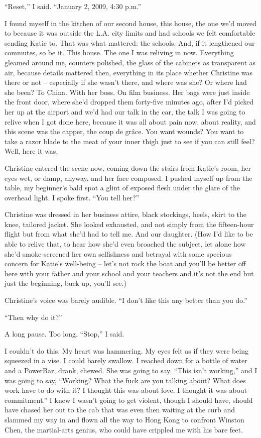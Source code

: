 \documentclass[11pt,a4paper]{article}
\newcommand{\qm}[1]{“#1”}
\begin{document}
\qm{Reset,} I said. \qm{January 2, 2009, 4:30 p.m.}

I found myself in the kitchen of our second house, this house, the one we'd moved to because it was outside the L.A. city limits and had schools we felt comfortable sending Katie to. That was what mattered: the schools. And, if it lengthened our commutes, so be it. This house. The one I was reliving in now. Everything gleamed around me, counters polished, the glass of the cabinets as transparent as air, because details mattered then, everything in its place whether Christine was there or not – especially if she wasn't there, and where was she? Or where had she been? To China. With her boss. On film business. Her bags were just inside the front door, where she'd dropped them forty-five minutes ago, after I'd picked her up at the airport and we'd had our talk in the car, the talk I was going to relive when I got done here, because it was all about pain now, about reality, and this scene was the capper, the coup de grâce. You want wounds? You want to take a razor blade to the meat of your inner thigh just to see if you can still feel? Well, here it was.

Christine entered the scene now, coming down the stairs from Katie's room, her eyes wet, or damp, anyway, and her face composed. I pushed myself up from the table, my beginner's bald spot a glint of exposed flesh under the glare of the overhead light. I spoke first. \qm{You tell her?}

Christine was dressed in her business attire, black stockings, heels, skirt to the knee, tailored jacket. She looked exhausted, and not simply from the fifteen-hour flight but from what she'd had to tell me. And our daughter. (How I'd like to be able to relive that, to hear how she'd even broached the subject, let alone how she'd smoke-screened her own selfishness and betrayal with some specious concern for Katie's well-being – let's not rock the boat and you'll be better off here with your father and your school and your teachers and it's not the end but just the beginning, buck up, you'll see.)

Christine's voice was barely audible. \qm{I don't like this any better than you do.}

\qm{Then why do it?}

A long pause. Too long. \qm{Stop,} I said.

I couldn't do this. My heart was hammering. My eyes felt as if they were being squeezed in a vise. I could barely swallow. I reached down for a bottle of water and a PowerBar, drank, chewed. She was going to say, \qm{This isn't working,} and I was going to say, \qm{Working? What the fuck are you talking about? What does work have to do with it? I thought this was about love. I thought it was about commitment.} I knew I wasn't going to get violent, though I should have, should have chased her out to the cab that was even then waiting at the curb and slammed my way in and flown all the way to Hong Kong to confront Winston Chen, the martial-arts genius, who could have crippled me with his bare feet.
\end{document}
